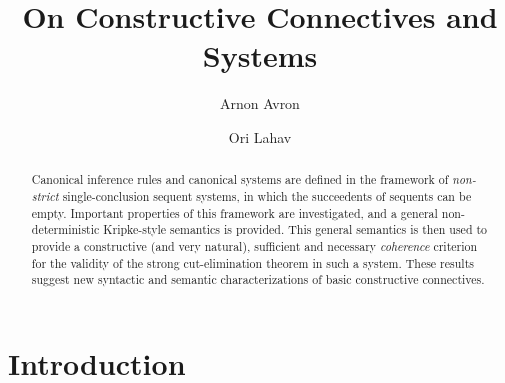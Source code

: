 \documentclass{LMCS}
\theoremstyle{remark}
\begin{document}
\title[On Constructive Connectives and Systems]
{On Constructive Connectives and Systems}

\author[A.~Avron]{Arnon Avron}	\address{School of Computer Science, Tel Aviv University, Israel}	  

\author[O.~Lahav]{Ori Lahav}	\address{ pt}	







\begin{abstract}
Canonical inference rules and canonical systems are
defined in the framework of {\em non-strict} single-conclusion sequent 
systems, in which the succeedents of sequents can be empty.
Important properties of this framework are investigated,
and a general non-deterministic Kripke-style semantics is provided.
This general semantics is then used  to
provide a constructive (and very
natural), sufficient and necessary {\em coherence} criterion for
the validity of the strong  cut-elimination theorem in such a system.
These results suggest new syntactic and semantic 
characterizations of basic constructive connectives.
\end{abstract}

\maketitle

\section{Introduction}
\end{document}

